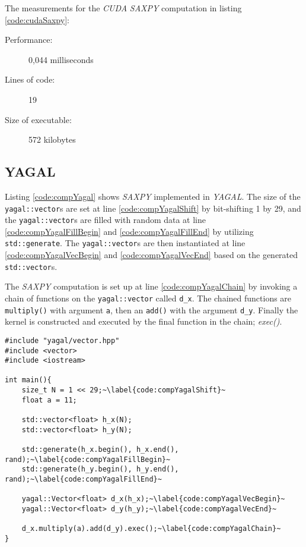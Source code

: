 The measurements for the \textit{CUDA} \textit{SAXPY} computation in listing \ref{code:cudaSaxpy}:
\begin{description}
    \item[Performance:] 0,044 milliseconds
    \item[Lines of code:] 19
    \item[Size of executable:] 572 kilobytes
\end{description}

\subsection{YAGAL}
Listing \ref{code:compYagal} shows \textit{SAXPY} implemented in \textit{YAGAL}. The size of the \texttt{yagal::vector}s are set at line \ref{code:compYagalShift} by bit-shifting 1 by 29, and the \texttt{yagal::vector}s are filled with random data at line \ref{code:compYagalFillBegin} and \ref{code:compYagalFillEnd} by utilizing \texttt{std::generate}. The \texttt{yagal::vector}s are then instantiated at line \ref{code:compYagalVecBegin} and \ref{code:compYagalVecEnd} based on the generated \texttt{std::vector}s.

The \textit{SAXPY} computation is set up at line \ref{code:compYagalChain} by invoking a chain of functions on the \texttt{yagal::vector} called \texttt{d\_x}. The chained functions are \texttt{multiply()} with argument \texttt{a}, then an \texttt{add()} with the argument \texttt{d\_y}. Finally the kernel is constructed and executed by the final function in the chain; \textit{exec()}.

\begin{lstlisting}[caption={\textit{YAGAL} \textit{SAXPY}.}, label={code:compYagal}]
#include "yagal/vector.hpp"
#include <vector>
#include <iostream>

int main(){
    size_t N = 1 << 29;~\label{code:compYagalShift}~
    float a = 11;

    std::vector<float> h_x(N);
    std::vector<float> h_y(N);

    std::generate(h_x.begin(), h_x.end(), rand);~\label{code:compYagalFillBegin}~
    std::generate(h_y.begin(), h_y.end(), rand);~\label{code:compYagalFillEnd}~

    yagal::Vector<float> d_x(h_x);~\label{code:compYagalVecBegin}~
    yagal::Vector<float> d_y(h_y);~\label{code:compYagalVecEnd}~
    
    d_x.multiply(a).add(d_y).exec();~\label{code:compYagalChain}~
}
\end{lstlisting}

